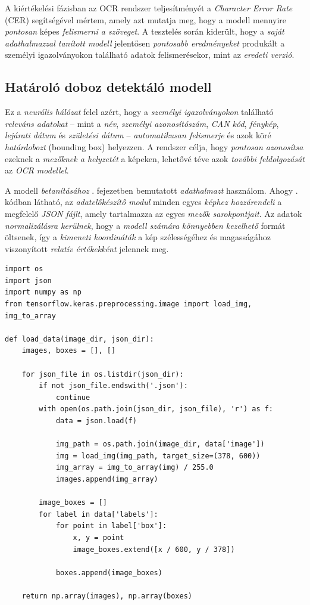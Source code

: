 \documentclass[
]{thesis-ekf}
\theoremstyle{definition}
\theoremstyle{remark}
\begin{document}
A kiértékelési fázisban az OCR rendszer teljesítményét a \emph{Character Error Rate} (CER) segítségével mértem, amely azt mutatja meg, hogy a modell mennyire \emph{pontosan} képes \emph{felismerni a szöveget}. A tesztelés során kiderült, hogy a \emph{saját adathalmazzal tanított modell} jelentősen \emph{pontosabb eredményeket} produkált a személyi igazolványokon található adatok felismerésekor, mint az \emph{eredeti verzió}.

\subsection{Határoló doboz detektáló modell}\label{boundingBoxDetector}

Ez a \emph{neurális hálózat} felel azért, hogy a \emph{személyi igazolványokon} található \emph{releváns adatokat} – mint a \emph{név}, \emph{személyi azonosítószám}, \emph{CAN kód}, \emph{fénykép}, \emph{lejárati dátum} és \emph{születési dátum} – \emph{automatikusan felismerje} és azok köré \emph{határdobozt} (bounding box) helyezzen. A rendszer célja, hogy \emph{pontosan azonosítsa} ezeknek a \emph{mezőknek a helyzetét} a képeken, lehetővé téve azok \emph{további feldolgozását} az \emph{OCR modellel}.

A modell \emph{betanításához} . fejezetben bemutatott \emph{adathalmazt} használom. Ahogy . kódban látható, az \emph{adatelőkészítő modul} minden egyes \emph{képhez hozzárendeli} a megfelelő \emph{JSON fájlt}, amely tartalmazza az egyes \emph{mezők sarokpontjait}. Az adatok \emph{normalizálásra kerülnek}, hogy a \emph{modell számára} \emph{könnyebben kezelhető} formát öltsenek, így a \emph{kimeneti koordináták} a kép szélességéhez és magasságához viszonyított \emph{relatív értékekként} jelennek meg.

\begin{lstlisting}[style=mypython,caption=Adathalmaz betöltése, label=kod-python5]
import os
import json
import numpy as np
from tensorflow.keras.preprocessing.image import load_img, img_to_array

def load_data(image_dir, json_dir):
	images, boxes = [], []

	for json_file in os.listdir(json_dir):
		if not json_file.endswith('.json'):
			continue
		with open(os.path.join(json_dir, json_file), 'r') as f:
			data = json.load(f)

			img_path = os.path.join(image_dir, data['image'])
			img = load_img(img_path, target_size=(378, 600))
			img_array = img_to_array(img) / 255.0
			images.append(img_array)

		image_boxes = []
		for label in data['labels']:
			for point in label['box']:
				x, y = point
				image_boxes.extend([x / 600, y / 378])

			boxes.append(image_boxes)

	return np.array(images), np.array(boxes)
	
\end{lstlisting}
\end{document}
